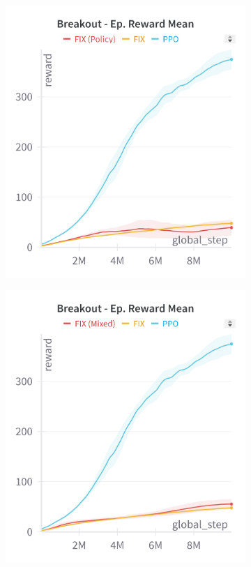 \begin{figure}[ht]
    \centering
    \begin{subfigure}[b]{0.45\textwidth}
        \centering
        \includegraphics[width=\textwidth]{images/breakout_fix_policy}
        \label{fig:breakout_weights1}
    \end{subfigure}
    \hfill
    \begin{subfigure}[b]{0.45\textwidth}
        \centering
        \includegraphics[width=\textwidth]{images/breakout_fix_mixed}

\end{subfigure}
\end{figure}
